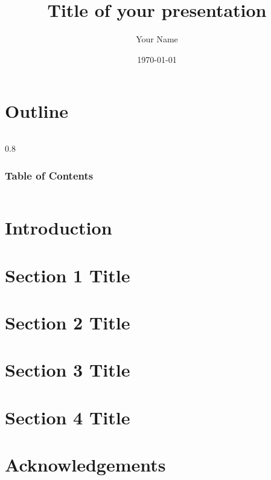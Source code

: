 \documentclass[xcolor=psr]{beamer}
\title[Short Title]{\textbf{Title of your presentation}}
\author[Surname, Year]{Your Name}
\institute[LITrans, RU]{Laboratory of Innovations in Transportation, \\
                        Ryerson University, Toronto, Canada}
\date{\today}
\begin{document}
\begin{frame}
\titlepage
\end{frame}

\section*{Outline}

\begin{frame}
	\begin{columns}
		\begin{column}{0.8\linewidth}
			\frametitle{Table of Contents}
			\vspace{-0.8cm}
			
			\tableofcontents
		\end{column}
	\end{columns}
\end{frame}

\section{Introduction}

\section{Section 1 Title}
\section{Section 2 Title}
\section{Section 3 Title}
\section{Section 4 Title}
\section*{Acknowledgements}
\end{document}
